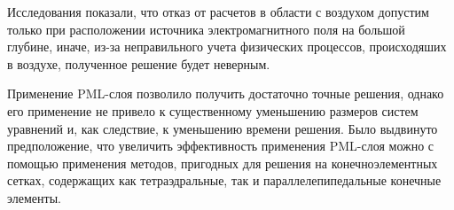 \documentclass[a4paper,12pt]{article}
\begin{document}
Исследования показали, что отказ от расчетов в области с воздухом допустим только при расположении источника электромагнитного поля на большой глубине, иначе, из-за неправильного учета физических процессов, происходяших в воздухе, полученное решение будет неверным.

Применение PML-слоя позволило получить достаточно точные решения, однако его применение не привело к существенному уменьшению размеров систем уравнений и, как следствие, к уменьшению времени решения. Было выдвинуто предположение, что увеличить эффективность применения PML-слоя можно с помощью применения методов, пригодных для решения на конечноэлементных сетках, содержащих как тетраэдральные, так и параллелепипедальные конечные элементы.


\clearpage
{}
\end{document}
